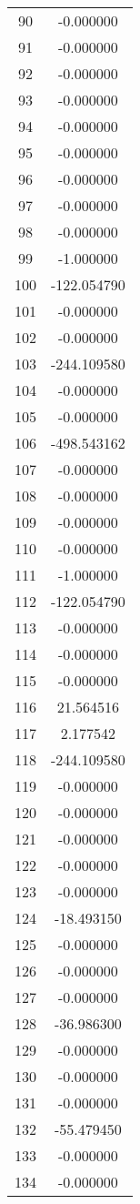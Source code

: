 \documentclass[12pt]{article}
\begin{document}
\begin{longtable}{@{}cc@{}}
90 & -0.000000 \\
91 & -0.000000 \\
92 & -0.000000 \\
93 & -0.000000 \\
94 & -0.000000 \\
95 & -0.000000 \\
96 & -0.000000 \\
97 & -0.000000 \\
98 & -0.000000 \\
99 & -1.000000 \\
100 & -122.054790 \\
101 & -0.000000 \\
102 & -0.000000 \\
103 & -244.109580 \\
104 & -0.000000 \\
105 & -0.000000 \\
106 & -498.543162 \\
107 & -0.000000 \\
108 & -0.000000 \\
109 & -0.000000 \\
110 & -0.000000 \\
111 & -1.000000 \\
112 & -122.054790 \\
113 & -0.000000 \\
114 & -0.000000 \\
115 & -0.000000 \\
116 & 21.564516 \\
117 & 2.177542 \\
118 & -244.109580 \\
119 & -0.000000 \\
120 & -0.000000 \\
121 & -0.000000 \\
122 & -0.000000 \\
123 & -0.000000 \\
124 & -18.493150 \\
125 & -0.000000 \\
126 & -0.000000 \\
127 & -0.000000 \\
128 & -36.986300 \\
129 & -0.000000 \\
130 & -0.000000 \\
131 & -0.000000 \\
132 & -55.479450 \\
133 & -0.000000 \\
134 & -0.000000 \\

\end{longtable}
\end{document}
